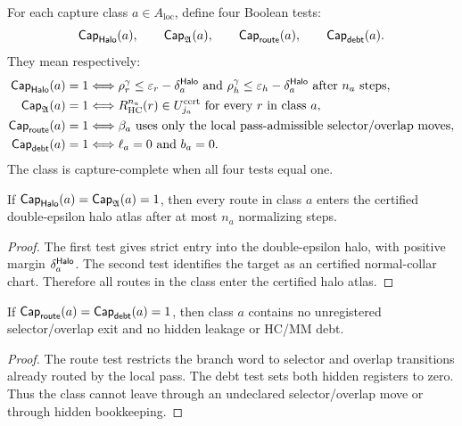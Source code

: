 \begin{definition}
For each capture class \(a\in A_{\mathrm{loc}}\), define four Boolean tests:
\[
\mathsf{Cap}_{\mathsf{Halo}}(a),
\qquad
\mathsf{Cap}_{\mathfrak A}(a),
\qquad
\mathsf{Cap}_{\mathsf{route}}(a),
\qquad
\mathsf{Cap}_{\mathsf{debt}}(a).
\]
They mean respectively:
\begin{align*}
\mathsf{Cap}_{\mathsf{Halo}}(a)=1
&\Longleftrightarrow
\rho_{r}^{\gamma}\le\varepsilon_r-\delta_a^{\mathsf{Halo}}
\text{ and }
\rho_{h}^{\gamma}\le\varepsilon_h-\delta_a^{\mathsf{Halo}}
\text{ after }n_a\text{ steps},\\
\mathsf{Cap}_{\mathfrak A}(a)=1
&\Longleftrightarrow
R_{\mathrm{HC}}^{n_a}(r)\in U_{j_a}^{\mathrm{cert}}
\text{ for every }r\text{ in class }a,\\
\mathsf{Cap}_{\mathsf{route}}(a)=1
&\Longleftrightarrow
\beta_a\text{ uses only the local pass-admissible selector/overlap moves},\\
\mathsf{Cap}_{\mathsf{debt}}(a)=1
&\Longleftrightarrow
\ell_a=0\text{ and }b_a=0.
\end{align*}
The class is capture-complete when all four tests equal one.
\end{definition}

\begin{lemma}
If \(\mathsf{Cap}_{\mathsf{Halo}}(a)=\mathsf{Cap}_{\mathfrak A}(a)=1\), then every route in class \(a\) enters the certified double-epsilon halo atlas after at most \(n_a\) normalizing steps.
\end{lemma}

\begin{proof}
The first test gives strict entry into the double-epsilon halo, with positive margin \(\delta_a^{\mathsf{Halo}}\). The second test identifies the target as an certified normal-collar chart. Therefore all routes in the class enter the certified halo atlas.
\end{proof}

\begin{lemma}
If \(\mathsf{Cap}_{\mathsf{route}}(a)=\mathsf{Cap}_{\mathsf{debt}}(a)=1\), then class \(a\) contains no unregistered selector/overlap exit and no hidden leakage or HC/MM debt.
\end{lemma}

\begin{proof}
The route test restricts the branch word to selector and overlap transitions already routed by the local pass. The debt test sets both hidden registers to zero. Thus the class cannot leave through an undeclared selector/overlap move or through hidden bookkeeping.
\end{proof}

